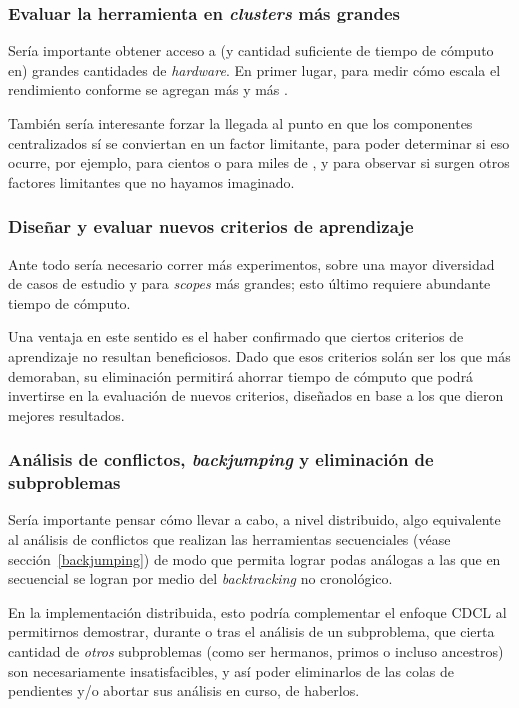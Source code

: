 \subsubsection{Evaluar la herramienta en \emph{clusters} más grandes}

Sería importante obtener acceso a (y cantidad suficiente de tiempo de cómputo en) grandes cantidades de \emph{hardware}. En primer lugar, para medir cómo escala el rendimiento conforme se agregan más y más \ws.

También sería interesante forzar la llegada al punto en que los componentes centralizados sí se conviertan en un factor limitante, para poder determinar si eso ocurre, por ejemplo, para cientos o para miles de \ws, y para observar si surgen otros factores limitantes que no hayamos imaginado.


\subsubsection{Diseñar y evaluar nuevos criterios de aprendizaje}

Ante todo sería necesario correr más experimentos, sobre una mayor diversidad de casos de estudio y para \emph{scopes} más grandes; esto último requiere abundante tiempo de cómputo.

Una ventaja en este sentido es el haber confirmado que ciertos criterios de aprendizaje no resultan beneficiosos. Dado que esos criterios solán ser los que más demoraban, su eliminación permitirá ahorrar tiempo de cómputo que podrá invertirse en la evaluación de nuevos criterios, diseñados en base a los que dieron mejores resultados.


\subsubsection{Análisis de conflictos, \emph{backjumping} y eliminación de subproblemas}

Sería importante pensar cómo llevar a cabo, a nivel distribuido, algo equivalente al análisis de conflictos que realizan las herramientas secuenciales (véase sección~\ref{backjumping}) de modo que permita lograr podas análogas a las que en secuencial se logran por medio del \emph{backtracking} no cronológico.

En la implementación distribuida, esto podría complementar el enfoque CDCL al permitirnos demostrar, durante o tras el análisis de un subproblema, que cierta cantidad de \emph{otros} subproblemas (como ser hermanos, primos o incluso ancestros) son necesariamente insatisfacibles, y así poder eliminarlos de las colas de pendientes y/o abortar sus análisis en curso, de haberlos.



